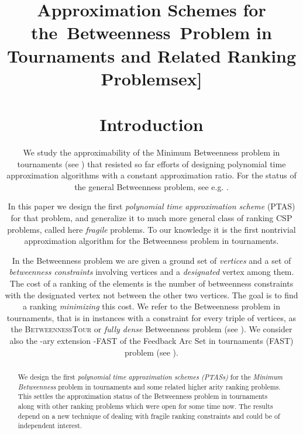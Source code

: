 \documentclass[dvips,11pt,letter]{article}
\newcommand{\betTour}{\textsc{BetweennessTour}}
\newcommand{\fast}{\textsc{FAST}}
\begin{document}
\title{\huge
  \textbf{
    Approximation Schemes for the~Betweenness~Problem in Tournaments   
    and Related Ranking Problems\2ex]}
\date{}
\maketitle

\begin{abstract}
{\normalsize
We design the first \emph{polynomial time approximation schemes (PTASs)} for the
\emph{Minimum Betweenness} problem in tournaments and some related higher arity
ranking problems. This settles the approximation status of the Betweenness problem
in tournaments along with other ranking problems which were open for some time now. The results depend on a new technique of dealing with fragile ranking constraints and could be of independent interest.
}
\end{abstract}



\section{Introduction}

We study the approximability of the Minimum Betweenness problem in tournaments
(see \cite{AA07}) that resisted so far efforts of designing polynomial time approximation algorithms with a constant approximation ratio.
For the status of the general Betweenness problem, see e.g. \cite{O79,CS98,AA07,CGM09}.

In this paper we design the first \emph{polynomial time approximation scheme} (PTAS) for that problem, and generalize it to much more general class of ranking CSP problems, called here \emph{fragile} problems.
To our knowledge it is the first nontrivial approximation algorithm for the Betweenness problem in tournaments.

In the Betweenness problem we are given a ground set of \emph{vertices} and a set of \emph{betweenness constraints} involving  vertices and a \emph{designated} vertex among them.
The cost of a ranking of the elements is the number of betweenness constraints with the designated vertex not between the other two vertices.
The goal is to find a ranking \emph{minimizing} this cost.
We refer to the Betweenness problem in tournaments, that is in instances with a constraint for every triple of vertices, as the \betTour{} or \emph{fully dense} Betweenness problem (see \cite{AA07}).
We consider also the -ary extension -\fast{} of the Feedback Arc Set in tournaments (\fast) problem (see \cite{mathieu09fast,A07,ACN08}).

}
\end{document}
